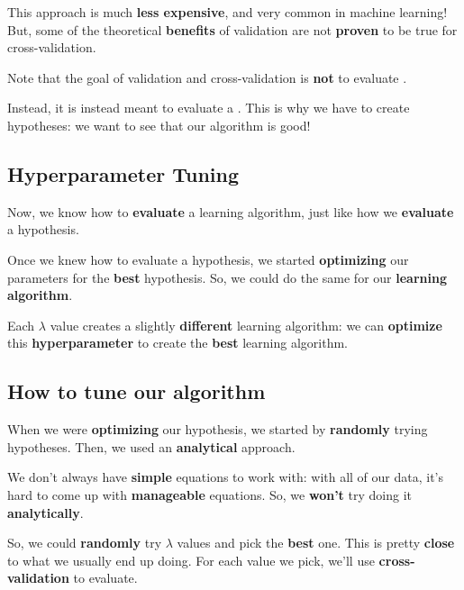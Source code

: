         This approach is much \textbf{less expensive}, and very common in machine learning! But, some of the theoretical \textbf{benefits} of validation are not \textbf{proven} to be true for cross-validation.\\
        
        \begin{clarification}
            Note that the goal of validation and cross-validation is \textbf{not} to evaluate .
            
            Instead, it is instead meant to evaluate a . This is why we have to create  hypotheses: we want to see that our algorithm is  good!
        \end{clarification}
        
    \subsection{Hyperparameter Tuning}
    
        Now, we know how to \textbf{evaluate} a learning algorithm, just like how we \textbf{evaluate} a hypothesis. 
        
        Once we knew how to evaluate a hypothesis, we started \textbf{optimizing} our parameters for the \textbf{best} hypothesis. So, we could do the same for our \textbf{learning algorithm}.
        
        Each $\lambda$ value creates a slightly \textbf{different} learning algorithm: we can \textbf{optimize} this \textbf{hyperparameter} to create the \textbf{best} learning algorithm.
        
    \subsection{How to tune our algorithm}
    
        When we were \textbf{optimizing} our hypothesis, we started by \textbf{randomly} trying hypotheses. Then, we used an \textbf{analytical} approach.
        
        We don't always have \textbf{simple} equations to work with: with all of our data, it's hard to come up with \textbf{manageable} equations. So, we \textbf{won't} try doing it \textbf{analytically}.
        
        So, we could \textbf{randomly} try $\lambda$ values and pick the \textbf{best} one. This is pretty \textbf{close} to what we usually end up doing. For each value we pick, we'll use \textbf{cross-validation} to evaluate.
        
